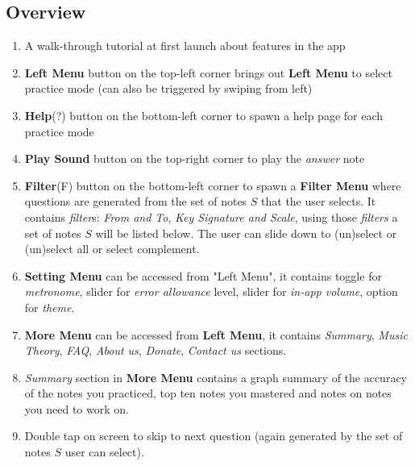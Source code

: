 \documentclass{article}
\begin{document}
\subsection{Overview}
\label{subsec:overview}
\begin{enumerate}
  \item \label{itm:tutorial} A walk-through tutorial at first launch about features in the app
  \item \label{itm:left_menu} \textbf{Left Menu} button on the top-left corner brings out \textbf{Left Menu} to select practice mode (can also be triggered by swiping from left)
  \item \label{itm:help} \textbf{Help}(?) button on the bottom-left corner to spawn a help page for each practice mode
  \item \label{itm:play_sound_general} \textbf{Play Sound} button on the top-right corner to play the \textit{answer} note
  \item \label{itm:filter_general} \textbf{Filter}(F) button on the bottom-left corner to spawn a \textbf{Filter Menu} where questions are generated from the set of notes $S$ that the user selects. It contains \textit{filter}s: \textit{From and To}, \textit{Key Signature and Scale}, using those \textit{filters} a set of notes $S$ will be listed below. The user can slide down to (un)select or (un)select all or select complement.
  \item \label{itm:setting_menu} \textbf{Setting Menu} can be accessed from "Left Menu", it contains toggle for \textit{metronome}, slider for \textit{error allowance} level, slider for \textit{in-app volume}, option for \textit{theme}.
  \item \label{itm:more_menu} \textbf{More Menu} can be accessed from \textbf{Left Menu}, it contains \textit{Summary}, \textit{Music Theory}, \textit{FAQ}, \textit{About us}, \textit{Donate}, \textit{Contact us} sections.
  \item \label{itm:summary} \textit{Summary} section in \textbf{More Menu} contains a graph summary of the accuracy of the notes you practiced, top ten notes you mastered and notes on notes you need to work on. 
  \item \label{itm:double_tap_next_question} Double tap on screen to skip to next question (again generated by the set of notes $S$ user can select).
\end{enumerate}
\end{document}
